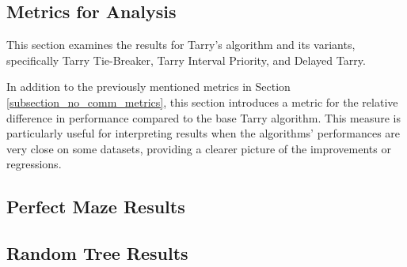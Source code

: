 \subsection{Metrics for Analysis}
\label{subsection_tarry_metrics}

This section examines the results for Tarry's algorithm and its variants, specifically Tarry Tie-Breaker, Tarry Interval Priority, and Delayed Tarry.

In addition to the previously mentioned metrics in Section \ref{subsection_no_comm_metrics}, this section introduces a metric for the relative difference in performance compared to the base Tarry algorithm. This measure is particularly useful for interpreting results when the algorithms' performances are very close on some datasets, providing a clearer picture of the improvements or regressions.

\subsection{Perfect Maze Results} 
\label{subsection_tarry_maze_results}

\subsection{Random Tree Results} 
\label{subsection_tarry_random_tree_results}


    
    
    
    
    